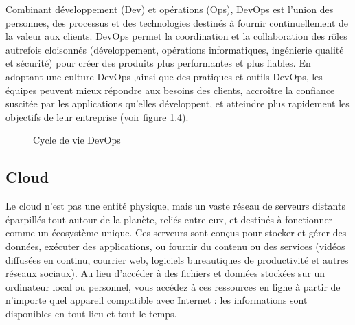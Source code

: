     Combinant développement (Dev) et opérations (Ops), DevOps est l'union des personnes, des processus et des technologies destinés à fournir continuellement de la valeur aux clients.
    DevOps permet la coordination et la collaboration des rôles autrefois cloisonnés (développement, opérations informatiques, ingénierie qualité et sécurité) pour créer des produits plus performantes et plus fiables. En adoptant une culture DevOps ,ainsi que des pratiques et outils DevOps, les équipes peuvent mieux répondre aux besoins des clients, accroître la confiance suscitée par les applications qu'elles développent, et atteindre plus rapidement les objectifs de leur entreprise \cite{1} (voir figure 1.4).
    \begin{figure}[H]
    \begin{center}

    \end{center}

    \caption{Cycle de vie DevOps}
\end{figure}
\subsection{\selectfont\Large  Cloud}

 Le cloud n’est pas une entité physique, mais un vaste réseau de serveurs distants éparpillés tout autour de la planète, reliés entre eux, et destinés à fonctionner comme un écosystème unique. Ces serveurs sont conçus pour stocker et gérer des données, exécuter des applications, ou fournir du contenu ou des services (vidéos diffusées en continu, courrier web, logiciels bureautiques de productivité et autres réseaux sociaux). Au lieu d’accéder à des fichiers et données stockées sur un ordinateur local ou personnel, vous accédez à ces ressources en ligne à partir de n’importe quel appareil compatible avec Internet : les informations sont disponibles en tout lieu et tout le temps.\cite{2} 
